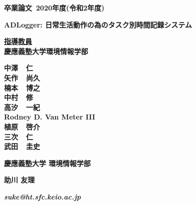 \pagestyle{empty}

\begin{center}

\vspace{5cm}

\textbf{\Large 卒業論文~2020年度(令和2年度)}

\vspace{2cm}

\textbf{\LARGE ADLogger: 日常生活動作の為のタスク別時間記録システム}

\vspace{3cm}

\textbf{\underline{\large 指導教員}}\\
\textbf{慶應義塾大学環境情報学部}

\textbf{\Large 中澤~~仁}\\
\textbf{\Large 矢作~~尚久}\\
\textbf{\Large 楠本~~博之}\\
\textbf{\Large 中村~~修}\\
\textbf{\Large 高汐~~一紀}\\
\textbf{\Large Rodney D. Van Meter III}\\
\textbf{\Large 植原~~啓介}\\
\textbf{\Large 三次~~仁}\\
\textbf{\Large 武田~~圭史}\\

\vspace{6cm}

\textbf{\LARGE 慶應義塾大学 環境情報学部}

\vspace{.5em}

\textbf{\LARGE 助川 友理}

\vspace{.3em}

\textbf{\it suke@ht.sfc.keio.ac.jp}



\newpage

\end{center}

\pagestyle{plain}
